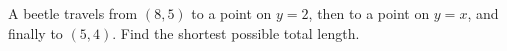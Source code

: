 A beetle travels from $(8,5)$ to a point on $y=2$, then to a point on $y=x$, and finally to $(5,4)$. Find the shortest possible total length.
